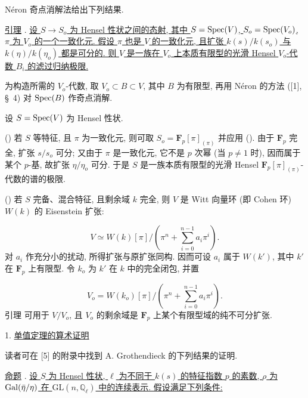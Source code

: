 N\'eron 奇点消解法给出下列结果.

\underline{引理} . \underline{设 $S\longrightarrow S_o$ 为 Hensel 性状之间的态射, 其中 $S=\operatorname{Spec}(V)$, $S_o=\operatorname{Spec}(V_o)$, $\pi$ 为 $V_o$ 的一个一致化元. 假设 $\pi$ 也是 $V$ 的一致化元, 且扩张 $k(s)/k(s_o)$ 与 $k(\eta)/k(\eta_o)$ 都是可分的. 则 $V$ 是一族在 $V_o$ 上本质有限型的光滑 Hensel $V_o$-代数 $B_i$ 的滤过归纳极限.}


为构造所需的 $V_o$-代数, 取 $V_o\subset B\subset V$, 其中 $B$ 为有限型, 再用 N\'eron 的方法 ([1], \S~4) 对 $\operatorname{Spec}(B)$ 作奇点消解.

设 $S=\operatorname{Spec}(V)$ 为 Hensel 性状.

() 若 $S$ 等特征, 且 $\pi$ 为一致化元, 则可取 $S_o=\mathbf{F}_p[\pi]_{(\pi)}$ 并应用 (). 由于 $\mathbf{F}_p$ 完全, 扩张 $s/s_o$ 可分; 又由于 $\pi$ 是一致化元, 它不是 $p$ 次幂 (当 $p\neq1$ 时), 因而属于某个 $p$-基, 故扩张 $\eta/\eta_o$ 可分. 于是 $S$ 是一族本质有限型的光滑 Hensel $\mathbf{F}_p[\pi]_{(\pi)}$-代数的谱的极限.

() 若 $S$ 完备、混合特征, 且剩余域 $k$ 完全, 则 $V$ 是 Witt 向量环 (即 Cohen 环) $W(k)$ 的 Eisenstein 扩张:

\begin{equation*}
V\simeq W(k)[\pi]/\left(\pi^n+\sum_{i=0}^{n-1}a_i\pi^i\right).
\end{equation*}
对 $a_i$ 作充分小的扰动, 所得扩张与原扩张同构. 因而可设 $a_i$ 属于 $W(k')$, 其中 $k'$ 在 $\mathbf{F}_p$ 上有限型. 令 $k_o$ 为 $k'$ 在 $k$ 中的完全闭包, 并置

\begin{equation*}
V_o=W(k_o)[\pi]/\left(\pi^n+\sum_{i=0}^{n-1}a_i\pi^i\right).
\end{equation*}
引理  可用于 $V/V_o$, 且 $V_o$ 的剩余域是 $\mathbf{F}_p$ 上某个有限型域的纯不可分扩张.

1. \underline{单值定理的算术证明}

读者可在 [5] 的附录中找到 A. Grothendieck 的下列结果的证明.

\underline{命题} . \underline{设 $S$ 为 Hensel 性状, $\ell$ 为不同于 $k(s)$ 的特征指数 $p$ 的素数, $\rho$ 为 $\operatorname{Gal}(\bar\eta/\eta)$ 在 $\mathrm{GL}(n,\mathbb{Q}_\ell)$ 中的连续表示. 假设满足下列条件:}

